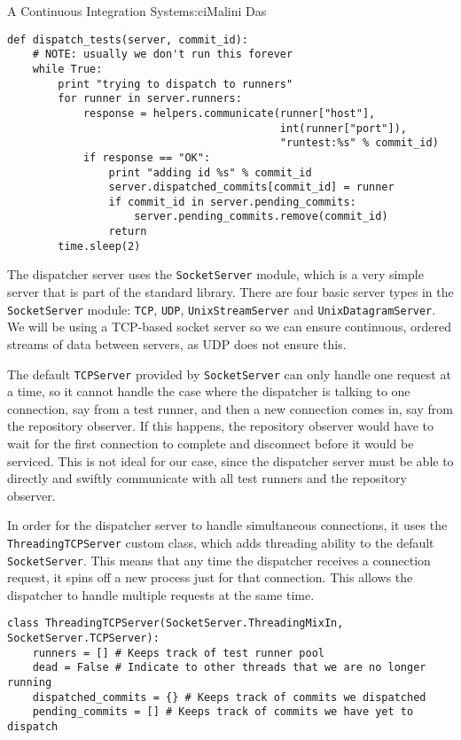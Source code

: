 \begin{aosachapter}{A Continuous Integration System}{s:ci}{Malini Das}
\begin{verbatim}
def dispatch_tests(server, commit_id):
    # NOTE: usually we don't run this forever
    while True:
        print "trying to dispatch to runners"
        for runner in server.runners:
            response = helpers.communicate(runner["host"],
                                           int(runner["port"]),
                                           "runtest:%s" % commit_id)
            if response == "OK":
                print "adding id %s" % commit_id
                server.dispatched_commits[commit_id] = runner
                if commit_id in server.pending_commits:
                    server.pending_commits.remove(commit_id)
                return
        time.sleep(2)
\end{verbatim}

The dispatcher server uses the \texttt{SocketServer} module, which is a
very simple server that is part of the standard library. There are four
basic server types in the \texttt{SocketServer} module: \texttt{TCP},
\texttt{UDP}, \texttt{UnixStreamServer} and \texttt{UnixDatagramServer}.
We will be using a TCP-based socket server so we can ensure continuous,
ordered streams of data between servers, as UDP does not ensure this.

The default \texttt{TCPServer} provided by \texttt{SocketServer} can
only handle one request at a time, so it cannot handle the case where
the dispatcher is talking to one connection, say from a test runner, and
then a new connection comes in, say from the repository observer. If
this happens, the repository observer would have to wait for the first
connection to complete and disconnect before it would be serviced. This
is not ideal for our case, since the dispatcher server must be able to
directly and swiftly communicate with all test runners and the
repository observer.

In order for the dispatcher server to handle simultaneous connections,
it uses the \texttt{ThreadingTCPServer} custom class, which adds
threading ability to the default \texttt{SocketServer}. This means that
any time the dispatcher receives a connection request, it spins off a
new process just for that connection. This allows the dispatcher to
handle multiple requests at the same time.

\begin{verbatim}
class ThreadingTCPServer(SocketServer.ThreadingMixIn, SocketServer.TCPServer):
    runners = [] # Keeps track of test runner pool
    dead = False # Indicate to other threads that we are no longer running
    dispatched_commits = {} # Keeps track of commits we dispatched
    pending_commits = [] # Keeps track of commits we have yet to dispatch
\end{verbatim}


\end{aosachapter}
